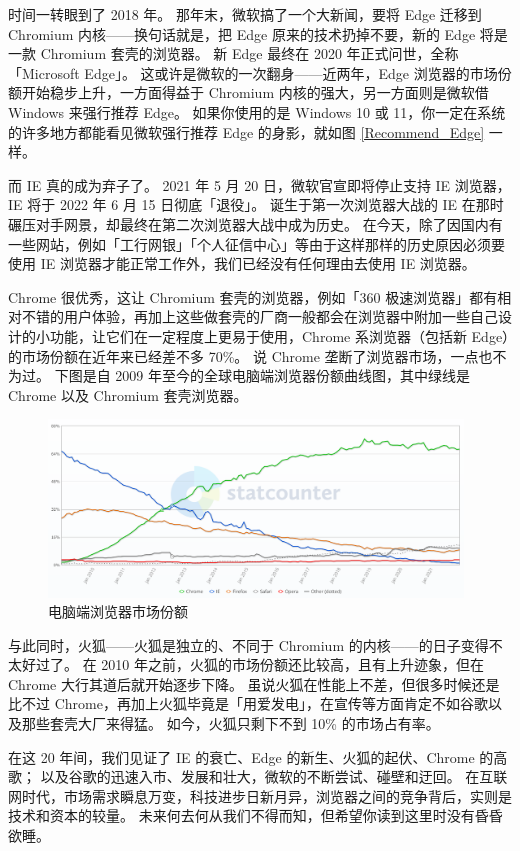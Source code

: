 时间一转眼到了 2018 年。
那年末，微软搞了一个大新闻，要将 Edge 迁移到 Chromium 内核——换句话就是，把 Edge 原来的技术扔掉不要，新的 Edge 将是一款 Chromium 套壳的浏览器。
新 Edge 最终在 2020 年正式问世，全称「Microsoft Edge」。
这或许是微软的一次翻身——近两年，Edge 浏览器的市场份额开始稳步上升，一方面得益于 Chromium 内核的强大，另一方面则是微软借 Windows 来强行推荐 Edge。
如果你使用的是 Windows 10 或 11，你一定在系统的许多地方都能看见微软强行推荐 Edge 的身影，就如图 \ref{Recommend_Edge} 一样。

而 IE 真的成为弃子了。
2021 年 5 月 20 日，微软官宣即将停止支持 IE 浏览器，IE 将于 2022 年 6 月 15 日彻底「退役」。
诞生于第一次浏览器大战的 IE 在那时碾压对手网景，却最终在第二次浏览器大战中成为历史。
在今天，除了因国内有一些网站，例如「工行网银」「个人征信中心」等由于这样那样的历史原因必须要使用 IE 浏览器才能正常工作外，我们已经没有任何理由去使用 IE 浏览器。

Chrome 很优秀，这让 Chromium 套壳的浏览器，例如「360 极速浏览器」都有相对不错的用户体验，再加上这些做套壳的厂商一般都会在浏览器中附加一些自己设计的小功能，让它们在一定程度上更易于使用，Chrome 系浏览器（包括新 Edge）的市场份额在近年来已经差不多 70\%。
说 Chrome 垄断了浏览器市场，一点也不为过。
下图是自 2009 年至今的全球电脑端浏览器份额曲线图，其中绿线是 Chrome 以及 Chromium 套壳浏览器。

\begin{figure}[htb!]
  \centering
  \includegraphics[width=11cm]{assets/Desktop_Browser_Market.png}
  \caption{电脑端浏览器市场份额}
  \label{Desktop_Browser_Market}
\end{figure}

与此同时，火狐——火狐是独立的、不同于 Chromium 的内核——的日子变得不太好过了。
在 2010 年之前，火狐的市场份额还比较高，且有上升迹象，但在 Chrome 大行其道后就开始逐步下降。
虽说火狐在性能上不差，但很多时候还是比不过 Chrome，再加上火狐毕竟是「用爱发电」，在宣传等方面肯定不如谷歌以及那些套壳大厂来得猛。
如今，火狐只剩下不到 10\% 的市场占有率。

在这 20 年间，我们见证了 IE 的衰亡、Edge 的新生、火狐的起伏、Chrome 的高歌；
以及谷歌的迅速入市、发展和壮大，微软的不断尝试、碰壁和迂回。
在互联网时代，市场需求瞬息万变，科技进步日新月异，浏览器之间的竞争背后，实则是技术和资本的较量。
未来何去何从我们不得而知，但希望你读到这里时没有昏昏欲睡。

